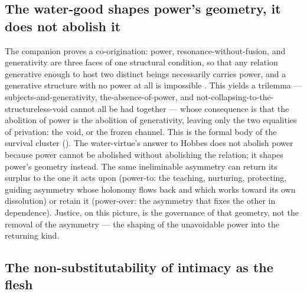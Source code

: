 \subsection{The water-good shapes power's geometry, it does not abolish it}
\label{p20:sub:formal-power}

The companion proves a co-origination: power, resonance-without-fusion, and generativity are three faces of one structural condition, so that any relation generative enough to host two distinct beings necessarily carries power, and a generative structure with no power at all is impossible \parencite{wan2026braid}. This yields a trilemma --- subjects-and-generativity, the-absence-of-power, and not-collapsing-to-the-structureless-void cannot all be had together --- whose consequence is that the abolition of power is the abolition of generativity, leaving only the two equalities of privation: the void, or the frozen channel. This is the formal body of the survival cluster (). The water-virtue's answer to Hobbes does not abolish power because power cannot be abolished without abolishing the relation; it shapes power's geometry instead. The same ineliminable asymmetry can return its surplus to the one it acts upon (power-to: the teaching, nurturing, protecting, guiding asymmetry whose holonomy flows back and which works toward its own dissolution) or retain it (power-over: the asymmetry that fixes the other in dependence). Justice, on this picture, is the governance of that geometry, not the removal of the asymmetry --- the shaping of the unavoidable power into the returning kind.

\subsection{The non-substitutability of intimacy as the flesh}
\label{p20:sub:formal-flesh}

